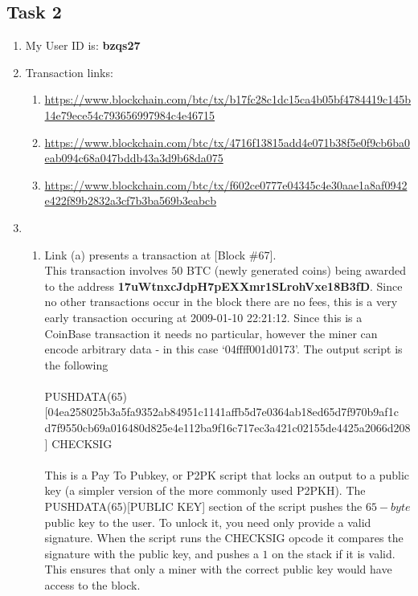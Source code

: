 \documentclass[12pt, a4paper]{article}
\begin{document}
\subsection*{Task 2}
\begin{enumerate}
\item My User ID is: \textbf{bzqs27}
\item Transaction links:
\begin{enumerate}
\item \url{https://www.blockchain.com/btc/tx/b17fc28c1dc15ca4b05bf4784419c145b14e79ece54c793656997984c4e46715}
\item \url{https://www.blockchain.com/btc/tx/4716f13815add4e071b38f5e0f9cb6ba0eab094c68a047bddb43a3d9b68da075}
\item \url{https://www.blockchain.com/btc/tx/f602ce0777e04345c4e30aae1a8af0942e422f89b2832a3cf7b3ba569b3eabcb}
\end{enumerate}
\item \begin{enumerate}
\item Link (a) presents a transaction at [Block \#67].\\
This transaction involves $50$ BTC (newly generated coins) being awarded to the address \textbf{17uWtnxcJdpH7pEXXmr1SLrohVxe18B3fD}. Since no other transactions occur in the block there are no fees, this is a very early transaction occuring at 2009-01-10 22:21:12. Since this is a CoinBase transaction it needs no particular, however the miner can encode arbitrary data - in this case  `04ffff001d0173'. The output script is the following\\
\\
PUSHDATA(65)[04ea258025b3a5fa9352ab84951c1141affb5d7e0364ab18ed65d7f970b9af1c\\d7f9550cb69a016480d825e4e112ba9f16c717ec3a421c02155de4425a2066d208] CHECKSIG\\
\\
This is a Pay To Pubkey, or P2PK script that locks an output to a public key (a simpler version of the more commonly used P2PKH). The PUSHDATA(65)[PUBLIC KEY] section of the script pushes the $65-byte$ public key to the user. To unlock it, you need only provide a valid signature. When the script runs the CHECKSIG opcode it compares the signature with the public key, and pushes a $1$ on the stack if it is valid. This ensures that only a miner with the correct public key would have access to the block.



\end{enumerate}
\end{enumerate}
\end{document}
